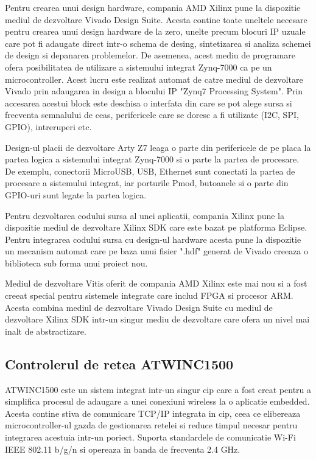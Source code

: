 Pentru crearea unui design hardware, compania AMD Xilinx pune la dispozitie mediul de dezvoltare Vivado Design Suite. Acesta contine toate uneltele necesare pentru 
crearea unui design hardware de la zero, unelte precum blocuri IP uzuale care pot fi adaugate direct intr-o schema de desing, sintetizarea si analiza schemei de 
design si depanarea problemelor. De asemenea, acest mediu de programare ofera posibilitatea de utilizare a sistemului integrat Zynq-7000 ca pe un microcontroller. 
Acest lucru este realizat automat de catre mediul de dezvoltare Vivado prin adaugarea in design a blocului IP "Zynq7 Processing System". Prin accesarea acestui block 
este deschisa o interfata din care se pot alege sursa si frecventa semnalului de ceas, perifericele care se doresc a fi utilizate (I2C, SPI, GPIO), intreruperi etc.

Design-ul placii de dezvoltare Arty Z7 leaga o parte din perifericele de pe placa la partea logica a sistemului integrat Zynq-7000 si o parte la partea de procesare. 
De exemplu, conectorii MicroUSB, USB, Ethernet sunt conectati la partea de procesare a sistemului integrat, iar porturile Pmod, butoanele si o parte din GPIO-uri sunt 
legate la partea logica.

Pentru dezvoltarea codului sursa al unei aplicatii, compania Xilinx pune la dispozitie mediul de dezvoltare Xilinx SDK care este bazat pe platforma Eclipse. Pentru 
integrarea codului sursa cu design-ul hardware acesta pune la dispozitie un mecanism automat care pe baza unui fisier ".hdf" generat de Vivado creeaza o biblioteca sub 
forma unui proiect nou.

Mediul de dezvoltare Vitis oferit de compania AMD Xilinx este mai nou si a fost creeat special pentru sistemele integrate care includ FPGA si procesor ARM. Acesta combina 
mediul de dezvoltare Vivado Design Suite cu mediul de dezvoltare Xilinx SDK intr-un singur mediu de dezvoltare care ofera un nivel mai inalt de abstractizare.

\subsection{Controlerul de retea ATWINC1500}\label{subsec:af_atwinc}
ATWINC1500 este un sistem integrat intr-un singur cip care a fost creat pentru a simplifica procesul de adaugare a unei conexiuni wireless la o aplicatie embedded. 
Acesta contine stiva de comunicare TCP/IP integrata in cip, ceea ce elibereaza microcontroller-ul gazda de gestionarea retelei si reduce timpul necesar pentru integrarea 
acestuia intr-un poriect. Suporta standardele de comunicatie Wi-Fi IEEE 802.11 b/g/n si opereaza in banda de frecventa 2.4 GHz.

